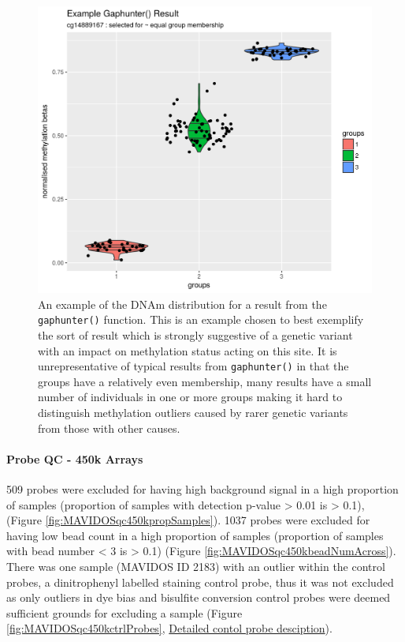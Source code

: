 \documentclass[
]{book}
\begin{document}
\begin{figure}

{\centering \includegraphics[width=0.8\linewidth]{figs/MAVIDOSgaphunterEgMonApr162018} 

}

\caption{An example of the DNAm distribution for a result from the \texttt{gaphunter()} function. This is an example chosen to best exemplify the sort of result which is strongly suggestive of a genetic variant with an impact on methylation status acting on this site. It is unrepresentative of typical results from \texttt{gaphunter()} in that the groups have a relatively even membership, many results have a small number of individuals in one or more groups making it hard to distinguish methylation outliers caused by rarer genetic variants from those with other causes.}\label{fig:MAVIDOSgaphunterEgMonApr162018}
\end{figure}



\hypertarget{probe-qc---450k-arrays}{%
\paragraph{Probe QC - 450k Arrays}\label{probe-qc---450k-arrays}}

509 probes were excluded for having high background signal in a high proportion of samples (proportion of samples with detection p-value \textgreater{} 0.01 is \textgreater{} 0.1), (Figure \ref{fig:MAVIDOSqc450kpropSamples}).
1037 probes were excluded for having low bead count in a high proportion of samples (proportion of samples with bead number \textless{} 3 is \textgreater{} 0.1) (Figure \ref{fig:MAVIDOSqc450kbeadNumAcross}).
There was one sample (MAVIDOS ID 2183) with an outlier within the control probes, a dinitrophenyl labelled staining control probe, thus it was not excluded as only outliers in dye bias and bisulfite conversion control probes were deemed sufficient grounds for excluding a sample (Figure \ref{fig:MAVIDOSqc450kctrlProbes}, \href{https://support.illumina.com/content/dam/illumina-support/documents/documentation/chemistry_documentation/infinium_assays/infinium_hd_methylation/infinium-hd-methylation-guide-15019519-01.pdf}{Detailed contol probe desciption}).
\end{document}
